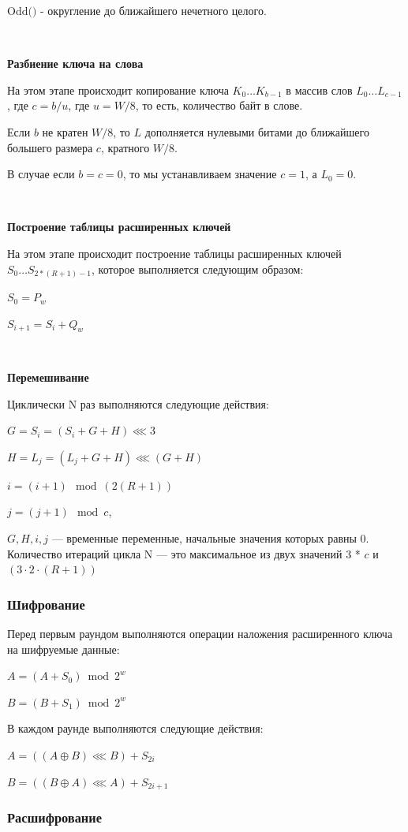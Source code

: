 \documentclass[a4paper]{report}
\begin{document}
$\textrm{Odd()}$ - округление до ближайшего нечетного целого.

~

\textbf{Разбиение ключа на слова}

На этом этапе происходит копирование ключа $K_0 … K_{b − 1}$ в массив слов $L_0… L_{c − 1}$, где $c = b / u$, где $u = W / 8$, то есть, количество байт в слове.

Если $b$ не кратен $W / 8$, то $L$ дополняется нулевыми битами до ближайшего большего размера $c$, кратного $W / 8$.

В случае если $b = c = 0$, то мы устанавливаем значение $c = 1$, а $L_0 = 0$.

~

\textbf{Построение таблицы расширенных ключей}

На этом этапе происходит построение таблицы расширенных ключей \\ $S_0 … S_{2 * ( R + 1 ) − 1}$, которое выполняется следующим образом: 

$S_{0}=P_{w}$

$S_{i+1}=S_i+Q_w$

~

\textbf{Перемешивание}

Циклически N раз выполняются следующие действия:

${\displaystyle G=S_{i}=(S_{i}+G+H)\lll 3}$

${\displaystyle H=L_{j}=(L_{j}+G+H)\lll (G+H)}$

${\displaystyle i=(i+1)\mod (2(R+1))}$

${\displaystyle j=(j+1)\mod c}$,

$G, H, i, j$ — временные переменные, начальные значения которых равны 0. Количество итераций цикла N — это максимальное из двух значений $3$ * $c$ и $(3 \cdot 2 \cdot (R + 1))$ 

\subsubsection{Шифрование}
Перед первым раундом выполняются операции наложения расширенного ключа на шифруемые данные:

$A=(A+S_0) \bmod {2^{w}}$

$B=(B+S_1)\bmod {2^{w}}$

В каждом раунде выполняются следующие действия: 

$A=((A\oplus B)\lll B)+S_{2i}$

$B=((B\oplus A)\lll A)+S_{2i+1}$

\subsubsection{Расшифрование}
\end{document}
